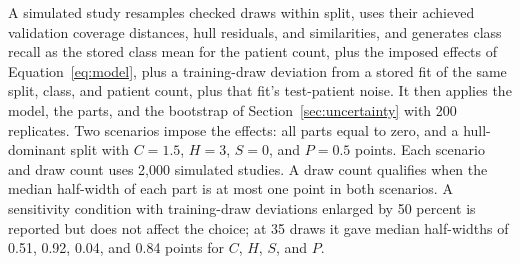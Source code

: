 \documentclass[11pt]{article}
\begin{document}
A simulated study resamples checked draws within split, uses their achieved validation coverage distances, hull residuals, and similarities, and generates class recall as the stored class mean for the patient count, plus the imposed effects of Equation~\eqref{eq:model}, plus a training-draw deviation from a stored fit of the same split, class, and patient count, plus that fit's test-patient noise. It then applies the model, the parts, and the bootstrap of Section~\ref{sec:uncertainty} with 200 replicates. Two scenarios impose the effects: all parts equal to zero, and a hull-dominant split with $C=1.5$, $H=3$, $S=0$, and $P=0.5$ points. Each scenario and draw count uses 2,000 simulated studies. A draw count qualifies when the median half-width of each part is at most one point in both scenarios. A sensitivity condition with training-draw deviations enlarged by 50 percent is reported but does not affect the choice; at 35 draws it gave median half-widths of 0.51, 0.92, 0.04, and 0.84 points for $C$, $H$, $S$, and $P$.



\end{document}

